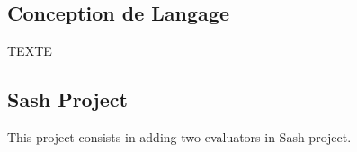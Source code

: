 \subsection*{Conception de Langage}

T\-E\-X\-T\-E

\subsection*{Sash Project}

This project consists in adding two evaluators in Sash project. 